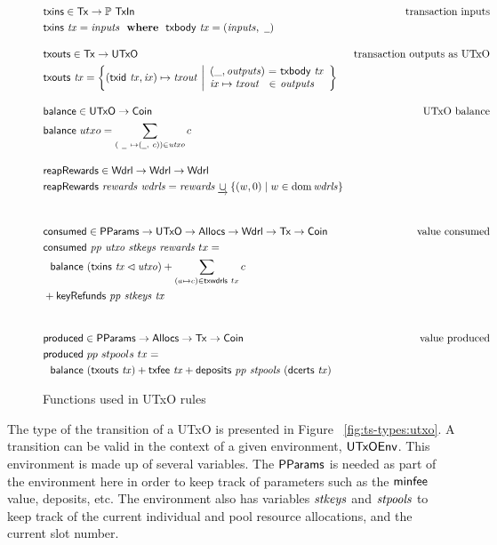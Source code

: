 \documentclass[11pt,a4paper,dvipsnames]{article}
\newcommand{\Tx}{\type{Tx}}
\newcommand{\UTxO}{\type{UTxO}}
\newcommand{\Wdrl}{\type{Wdrl}}
\newcommand{\Coin}{\type{Coin}}
\newcommand{\PParams}{\type{PParams}}
\newcommand{\Allocs}{\type{Allocs}}
\newcommand{\TxIn}{\type{TxIn}}
\newcommand{\UTxOEnv}{\type{UTxOEnv}}
\newcommand{\txins}[1]{\fun{txins}~ \var{#1}}
\newcommand{\txouts}[1]{\fun{txouts}~ \var{#1}}
\newcommand{\balance}[1]{\fun{balance}~ \var{#1}}
\newcommand{\deposits}[2]{\fun{deposits}~ \var{#1} ~ \var{#2}}
\newcommand{\keyRefunds}[3]{\fun{keyRefunds}~ \var{#1}~ \var{#2}~ \var{#3}}
\newcommand{\consumed}[4]{\fun{consumed}~ \var{#1}~ \var{#2}~ \var{#3}~ \var{#4}}
\newcommand{\dcerts}[1]{\fun{dcerts}~ \var{#1}}
\newcommand{\txbody}[1]{\fun{txbody}~ \var{#1}}
\newcommand{\txfee}[1]{\fun{txfee}~ \var{#1}}
\newcommand{\wcard}[0]{\underline{\phantom{a}}}
\theoremstyle{definition}
\theoremstyle{definition}
\begin{document}
\begin{figure}
  \begin{align*}
    & \fun{txins} \in \Tx \to \powerset{\TxIn}
    & \text{transaction inputs} \\
    & \txins{tx} = \var{inputs} \where \txbody{tx} = (\var{inputs}, ~\wcard)
    \nextdef
    & \fun{txouts} \in \Tx \to \UTxO
    & \text{transaction outputs as UTxO} \\
    & \fun{txouts} ~ \var{tx} =
      \left\{ (\fun{txid} ~ \var{tx}, \var{ix}) \mapsto \var{txout} ~
      \middle| \begin{array}{l@{~}c@{~}l}
                 (\_, \var{outputs}) & = & \txbody{tx} \\
                 \var{ix} \mapsto \var{txout} & \in & \var{outputs}
               \end{array}
      \right\}
    \nextdef
    & \fun{balance} \in \UTxO \to \Coin
    & \text{UTxO balance} \\
    & \fun{balance} ~ utxo = \sum_{(~\wcard ~ \mapsto (\wcard, ~c)) \in \var{utxo}} c
    \nextdef
    & \fun{reapRewards} \in \Wdrl \to \Wdrl \to \Wdrl \\
        & \fun{reapRewards}~\var{rewards}~\var{wdrls} =
         \var{rewards} \unionoverrideRight \{(w, 0) \mid w \in \dom \var{wdrls}\} \\
    \nextdef
    & \fun{consumed} \in \PParams \to \UTxO \to \Allocs \to \Wdrl \to \Tx \to \Coin
    & \text{value consumed} \\
    & \consumed{pp}{utxo}{stkeys}{rewards}~{tx} = \\
    & ~~\balance{(\txins{tx} \restrictdom \var{utxo})} +
        \sum_{(a \mapsto c) \in \fun{txwdrls}~{tx}} c  \\
        & + \keyRefunds{pp}{stkeys}{tx} \\
    \nextdef
    & \fun{produced} \in \PParams \to \Allocs \to \Tx \to \Coin
    & \text{value produced} \\
    & \fun{produced} ~ pp ~ stpools ~ tx = \\
    &~~\balance{(\txouts{tx})}
    + \txfee{tx} + \deposits{pp}{stpools}~{(\dcerts{tx})}\\
  \end{align*}

  \caption{Functions used in UTxO rules}
  \label{fig:derived-defs:utxo}
\end{figure}


The type of the transition of a UTxO is presented in Figure
~\ref{fig:ts-types:utxo}. A
transition can be valid in the context of a given environment, $\UTxOEnv$.
This environment is made up of several variables.
The $\PParams$ is needed as part of the environment here in order to
keep track of parameters such as the $\mathsf{minfee}$ value, deposits, etc.
The environment also has variables $\mathit{stkeys}$ and $\mathit{stpools}$
to keep track of the current individual and pool resource allocations,
and the current slot number.
\end{document}
